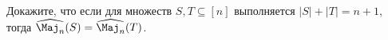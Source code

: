 Докажите, что если для множеств $S, T \subseteq [n]$ выполняется $|S| + |T| = n + 1$, тогда
$\widehat{\Maj_n}(S) = \widehat{\Maj_n}(T)$.
